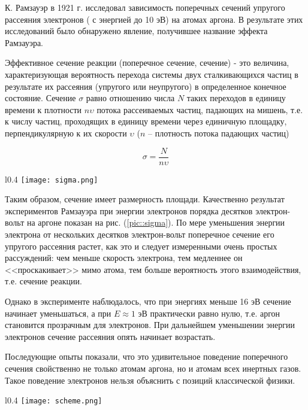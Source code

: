 К. Рамзауэр в 1921 г. исследовал зависимость поперечных сечений упругого
рассеяния электронов ( с энергией до 10 эВ) на атомах аргона. В результате этих
исследований было обнаружено явление, получившее название эффекта Рамзауэра.

Эффективное сечение реакции (поперечное сечение, сечение) - это величина,
характеризующая вероятность перехода системы двух сталкивающихся частиц в
результате их рассеяния (упругого или неупругого) в определенное конечное
состояние. Сечение $\sigma$ равно отношению числа $N$ таких переходов в единицу
времени к плотности $n \upsilon$ потока рассеиваемых частиц, падающих на мишень,
т.е. к числу частиц, проходящих в единицу времени через единичную площадку,
перпендикулярную к их скорости $\upsilon$ ($n$ -- плотность потока падающих
частиц)

\begin{equation} \label{sigma}
  \sigma = \frac{N}{n \upsilon}
\end{equation}

\begin{wrapfigure}[14]{l}{0.4\linewidth}
  \texttt{[image: sigma.png]}
  \label{pic::sigma}
  \caption{Качественная картина результатов измерения упругого рассеяния
  электронов в аргоне}
\end{wrapfigure}

Таким образом, сечение имеет размерность площади.
Качественно результат экспериментов Рамзауэра при энергии электронов порядка
десятков электрон-вольт на аргоне показан на рис. (\ref{pic::sigma}). По мере
уменьшения энергии электрона от нескольких десятков электрон-вольт поперечное
сечение его упругого рассеяния растет, как это и следует измеренными очень простых
рассуждений: чем меньше скорость электрона, тем медленнее он <<проскакивает>>
мимо атома, тем больше вероятность этого взаимодействия, т.е. сечение реакции.

Однако в эксперименте наблюдалось, что при энергиях меньше 16 эВ сечение
начинает уменьшаться, а при $E \approx 1$ эВ практически равно нулю, т.е. аргон
становится прозрачным для электронов. При дальнейшем уменьшении энергии
электронов сечение рассеяния опять начинает возрастать.

Последующие опыты показали, что это удивительное поведение поперечного сечения
свойственно не только атомам аргона, но и атомам всех инертных газов. Такое
поведение электронов нельзя объяснить с позиций классической физики.

\begin{wrapfigure}[13]{l}{0.4\linewidth}
  \texttt{[image: scheme.png]}
  \caption{Схема установки для измерения сечения рассеяния электронов в газах}
  \label{pic::scheme}
\end{wrapfigure}

